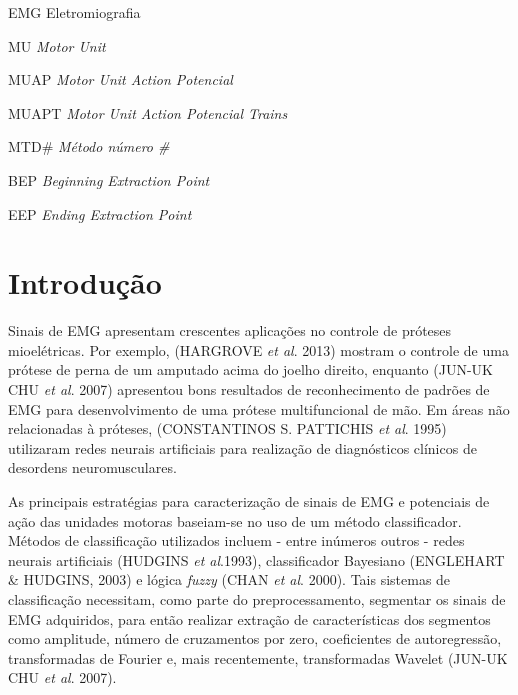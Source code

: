\documentclass[
	12pt,				%
	openright,			%
	oneside,			%
	a4paper,			%
	english,			%
	francais,			%
	spanish,			%
	brazil				%
	]{abntex2}
\begin{document}
\listoffigures*
\cleardoublepage

\listoftables*
\cleardoublepage

\begin{siglas}
  	\item[EMG]		Eletromiografia
	\item[MU]		\emph{Motor Unit}
  	\item[MUAP]		\emph{Motor Unit Action Potencial}
	\item[MUAPT]	\emph{Motor Unit Action Potencial Trains}
	\item[MTD\#]	\emph{Método número \#}
	\item[BEP]		\emph{Beginning Extraction Point}
	\item[EEP]		\emph{Ending Extraction Point}
\end{siglas}

\tableofcontents*
\cleardoublepage



\textual

\chapter{Introdução}

Sinais de EMG apresentam crescentes aplicações no controle de próteses mioelétricas. Por exemplo, (HARGROVE \emph{et al}. 2013) mostram o controle de uma prótese de perna de um amputado acima do joelho direito, enquanto (JUN-UK CHU \emph{et al}. 2007) apresentou bons resultados de reconhecimento de padrões de EMG para desenvolvimento de uma prótese multifuncional de mão. Em áreas não relacionadas à próteses, (CONSTANTINOS S. PATTICHIS \emph{et al}. 1995) utilizaram redes neurais artificiais para realização de diagnósticos clínicos de desordens neuromusculares.

As principais estratégias para caracterização de sinais de EMG e potenciais de ação das unidades motoras baseiam-se no uso de um método classificador. Métodos de classificação utilizados incluem - entre inúmeros outros - redes neurais artificiais (HUDGINS \emph{et al}.1993), classificador Bayesiano (ENGLEHART \& HUDGINS, 2003) e lógica \emph{fuzzy} (CHAN \emph{et al}. 2000). Tais sistemas de classificação necessitam, como parte do preprocessamento, segmentar os sinais de EMG adquiridos, para então realizar extração de características dos segmentos como amplitude, número de cruzamentos por zero, coeficientes de autoregressão, transformadas de Fourier e, mais recentemente, transformadas Wavelet (JUN-UK CHU \emph{et al}. 2007). 
\end{document}
